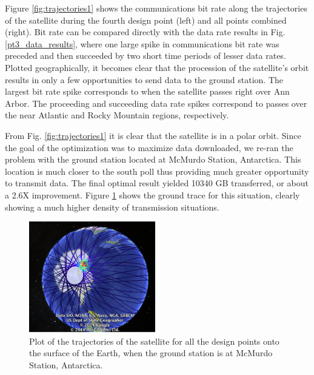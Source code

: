 \documentclass[]{aiaa-tc} %
\begin{document}
        Figure \ref{fig:trajectories1} shows the communications bit rate along the trajectories of the
        satellite during the fourth design point (left) and all points combined (right). 
        Bit rate can be compared directly with the data rate results in 
        Fig. \ref{pt3_data_results}, where one large spike in communications
        bit rate was preceded and then succeeded by two short time periods of lesser
        data rates. Plotted geographically, it becomes clear that the procession of
        the satellite's orbit results in only a few opportunities to send data to the ground station.
        The largest bit rate spike corresponds to when the satellite passes right over Ann Arbor. 
        The proceeding and succeeding data rate spikes correspond to passes over the near Atlantic and
        Rocky Mountain regions, respectively.

       

        From Fig. \ref{fig:trajectories1} it is clear that the satellite is in a polar orbit. Since the
        goal of the optimization was to maximize data downloaded, we re-ran the problem with the ground 
        station located at McMurdo Station, Antarctica. This location is much closer to the south poll 
        thus providing much greater opportunity to transmit data. The final optimal result yielded 10340 GB
        transferred, or about a 2.6X improvement. Figure \ref{fig:trajectories2} shows the ground trace 
        for this situation, clearly showing a much higher density of transmission situations. 

        \begin{figure}[!htb]
            \centering
            \includegraphics[width=0.49\textwidth]{images/allpts_gearth_mcmurdo}
            \caption{Plot of the trajectories of the satellite
            for all the design points onto the surface of the Earth, when the ground 
            station is at McMurdo Station, Antarctica. 
            \label{fig:trajectories2}
            }
        \end{figure}
\end{document}
